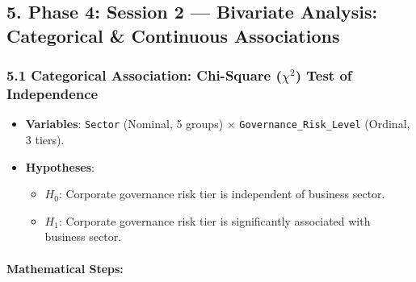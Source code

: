 \documentclass[
]{article}
\providecommand{\tightlist}{%
  \setlength{\itemsep}{0pt}\setlength{\parskip}{0pt}}
\begin{document}
\subsection{5. Phase 4: Session 2 --- Bivariate Analysis: Categorical \&
Continuous
Associations}\label{phase-4-session-2-bivariate-analysis-categorical-continuous-associations}

\subsubsection{\texorpdfstring{5.1 Categorical Association: Chi-Square
(\(\chi^2\)) Test of
Independence}{5.1 Categorical Association: Chi-Square (\textbackslash chi\^{}2) Test of Independence}}\label{categorical-association-chi-square-chi2-test-of-independence}

\begin{itemize}
\tightlist
\item
  \textbf{Variables}: \texttt{Sector} (Nominal, 5 groups) \(\times\)
  \texttt{Governance\_Risk\_Level} (Ordinal, 3 tiers).
\item
  \textbf{Hypotheses}:

  \begin{itemize}
  \tightlist
  \item
    \(H_0\): Corporate governance risk tier is independent of business
    sector.
  \item
    \(H_1\): Corporate governance risk tier is significantly associated
    with business sector.
  \end{itemize}
\end{itemize}

\paragraph{Mathematical Steps:}\label{mathematical-steps}
\end{document}
